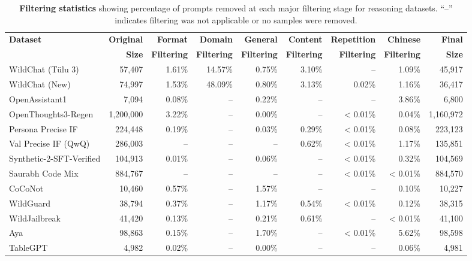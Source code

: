\documentclass[table]{ai2style/ai2}
\begin{document}
{{\begin{table}[!h]
  \centering
  \setlength\tabcolsep{4pt}
  {\footnotesize
  \begin{tabular}{l r r r r r r r r}
  \toprule
  {\bf Dataset} & {\bf Original} & {\bf Format} & {\bf Domain} & {\bf General} &
   {\bf Content} & {\bf Repetition} & {\bf Chinese} & {\bf Final} \\
   & {\bf Size} & {\bf Filtering} & {\bf Filtering} & {\bf Filtering} &
  {\bf Filtering} & {\bf Filtering} & {\bf Filtering} & {\bf Size} \\
  \midrule
  \rowcolor{ai2offwhite} WildChat (Tülu 3) & 57,407 & 1.61\% & 14.57\% & 0.75\% & 3.10\% & -- & 1.09\% &
  45,917 \\
  WildChat (New) & 74,997 & 1.53\% & 48.09\% & 0.80\% & 3.13\% & 0.02\% & 1.16\% & 36,417 \\
  \rowcolor{ai2offwhite} OpenAssistant1 & 7,094 & 0.08\% & -- & 0.22\% & -- & -- & 3.86\% & 6,800 \\
  OpenThoughts3-Regen & 1,200,000 & 3.22\% & -- & 0.00\% & -- & < 0.01\% & 0.04\% & 1,160,972
  \\
  \rowcolor{ai2offwhite} Persona Precise IF & 224,448 & 0.19\% & -- & 0.03\% & 0.29\% & < 0.01\% &
  0.08\% & 223,123 \\
  Val Precise IF (QwQ) & 286,003 & -- & -- & -- & 0.62\% & < 0.01\% & 1.17\% & 135,851 \\
  \rowcolor{ai2offwhite} Synthetic-2-SFT-Verified & 104,913 & 0.01\% & -- & 0.06\% & -- & < 0.01\% & 0.32\% &
  104,569 \\
  Saurabh Code Mix & 884,767 & -- & -- & -- & -- & < 0.01\% & < 0.01\% & 884,570 \\
  \rowcolor{ai2offwhite} CoCoNot & 10,460 & 0.57\% & -- & 1.57\% & -- & -- & 0.10\% & 10,227 \\
  WildGuard & 38,794 & 0.37\% & -- & 1.17\% & 0.54\% & < 0.01\% & 0.12\% & 38,315 \\
  \rowcolor{ai2offwhite} WildJailbreak & 41,420 & 0.13\% & -- & 0.21\% & 0.61\% & -- & < 0.01\% &
  41,100 \\
  Aya & 98,863 & 0.15\% & -- & 1.70\% & -- & < 0.01\% & 5.62\% & 98,598 \\
  \rowcolor{ai2offwhite} TableGPT & 4,982 & 0.02\% & -- & 0.00\% & -- & -- & 0.06\% & 4,981 \\
  \bottomrule
  \end{tabular}}
  \vspace{3pt}
  \caption{\textbf{Filtering statistics} showing percentage of prompts removed at each major
  filtering stage for reasoning datasets. ``--'' indicates filtering was not applicable or no
  samples were removed.}
  \label{tab:filtering_stats}
  \end{table}

}}
\end{document}
